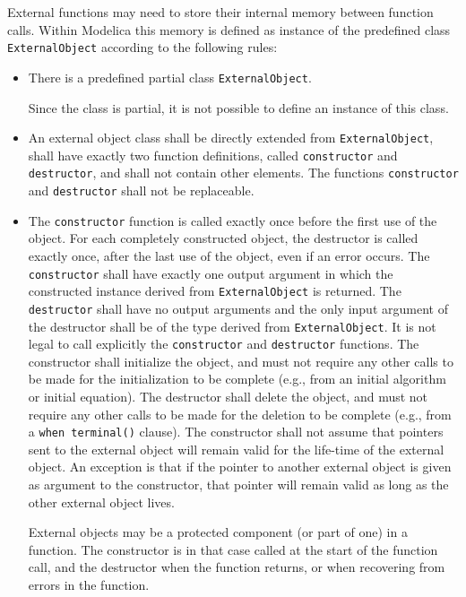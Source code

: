 External functions may need to store their internal memory between function calls.
Within Modelica this memory is defined as instance of the
predefined class \lstinline!ExternalObject! according to the following rules:
\begin{itemize}
\item
  There is a predefined partial class \lstinline!ExternalObject!.
  \begin{nonnormative}
  Since the class is partial, it is not possible to define an instance of this class.
  \end{nonnormative}
\item
  An external object class shall be directly extended from
  \lstinline!ExternalObject!, shall have exactly two function definitions, called
  \lstinline!constructor! and \lstinline!destructor!, and shall not contain other elements.
  The functions \lstinline!constructor! and \lstinline!destructor! shall not be replaceable.
\item
  The \lstinline!constructor! function is called exactly once before the first use
  of the object. For each completely constructed object, the destructor
  is called exactly once, after the last use of the object, even if an
  error occurs. The \lstinline!constructor! shall have exactly one output argument
  in which the constructed instance derived from \lstinline!ExternalObject! is
  returned. The \lstinline!destructor! shall have no output arguments and the only
  input argument of the destructor shall be of the type derived from
  \lstinline!ExternalObject!. It is not legal to call explicitly the \lstinline!constructor! and
  \lstinline!destructor! functions. The constructor shall initialize the object, and
  must not require any other calls to be made for the initialization to
  be complete (e.g., from an initial algorithm or initial equation). The
  destructor shall delete the object, and must not require any other
  calls to be made for the deletion to be complete (e.g., from a \lstinline!when terminal()! clause). The constructor shall not assume that pointers sent
  to the external object will remain valid for the life-time of the external object.  An exception is that if the pointer to another external object is
  given as argument to the constructor, that pointer will remain valid as long as the other external object lives.
  \begin{nonnormative}
  External objects may be a protected component (or part of one) in a function.  The constructor is in that case called at the start of the function call,
  and the destructor when the function returns, or when recovering from errors in the function.

\end{nonnormative}
\end{itemize}
